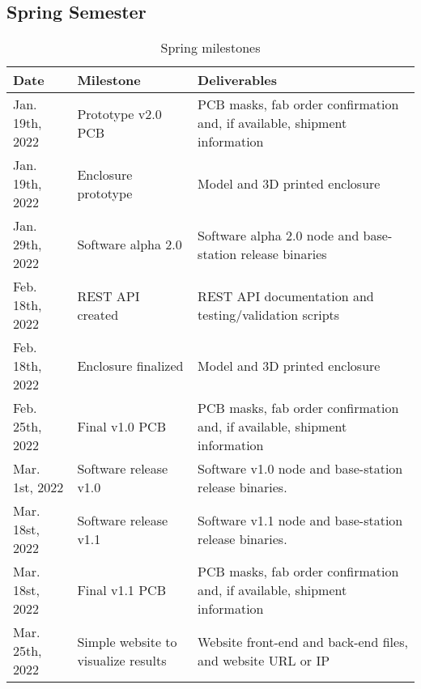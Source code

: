 \subsection{Spring Semester}
%
%
\begin{table}[H]
    \begin{tabularx}{\linewidth}{|X|X|X|}
        \hline
        Date & Milestone & Deliverables \\
        \hline\hline
        Jan. 19th, 2022 
        & Prototype v2.0 PCB 
        & PCB masks, fab order confirmation and, if available, shipment information \\
        
        \hline
        Jan. 19th, 2022
        & Enclosure prototype
        & Model and 3D printed enclosure
        \\
        
        \hline
        Jan. 29th, 2022 
        & Software alpha 2.0 
        & Software alpha 2.0 node and base-station release binaries
        \\
        
        \hline
        Feb. 18th, 2022
        & REST API created
        & REST API documentation and testing/validation scripts
        \\
        
        \hline
        Feb. 18th, 2022
        & Enclosure finalized
        & Model and 3D printed enclosure
        \\
        
        \hline
        Feb. 25th, 2022
        & Final v1.0 PCB
        & PCB masks, fab order confirmation and, if available, shipment information 
        \\
        
        \hline
        Mar. 1st, 2022
        & Software release v1.0
        & Software v1.0 node and base-station release binaries. 
        \\ 
        
        \hline
        Mar. 18st, 2022
        & Software release v1.1
        & Software v1.1 node and base-station release binaries. 
        \\ 
        
        \hline
        Mar. 18st, 2022
        & Final v1.1 PCB
        & PCB masks, fab order confirmation and, if available, shipment information 
        \\
        
        \hline
        Mar. 25th, 2022
        & Simple website to visualize results
        & Website front-end and back-end files, and website URL or IP
        \\
        
        \hline
    \end{tabularx}
    \caption{Spring milestones}
\end{table}
